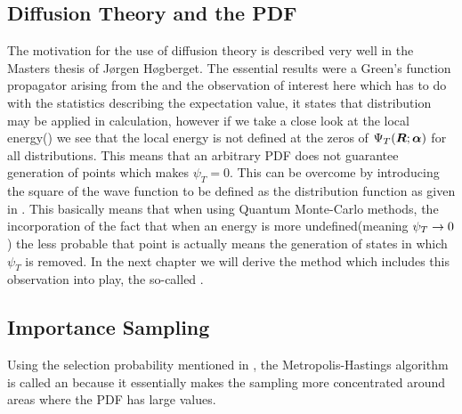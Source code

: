     \subsection{Diffusion Theory and the PDF\label{susec:diffTHpdf}}
        The motivation for the use of diffusion theory is described very well
        in the Masters thesis of Jørgen Høgberget\cite{jorgenThesis}. The
        essential results were a Green's function propagator arising from the
         and the observation of interest here
        which has to do with the statistics describing the expectation value,
        it states that  distribution may be applied in calculation,
        however if we take a close look at the local energy() we
        see that the local energy is not defined at the zeros of ${\Psi}_T(\boldsymbol{{R}};\boldsymbol{{\alpha}})$ for
        all distributions.  This means that an arbitrary PDF does not guarantee
        generation of points which makes $\psi_T=0$. This can be overcome by
        introducing the square of the wave function to be defined as the
        distribution function as given in . This basically means
        that when using Quantum Monte-Carlo methods, the incorporation of the
        fact that when an energy is more undefined(meaning $\psi_T\rightarrow 0$) the
        less probable that point is actually means the generation of states in
        which $\psi_T$ is removed. In the next chapter we will derive the
        method which includes this observation into play, the so-called
        .

    \subsection{Importance Sampling\label{susec:impSamp}}
        Using the selection probability mentioned in , the
        Metropolis-Hastings algorithm is called an 
        because it essentially makes the sampling more concentrated around
        areas where the PDF has large values.

